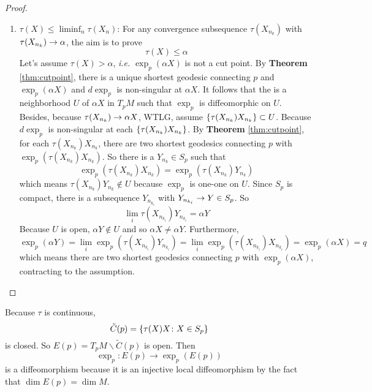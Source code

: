 \begin{enumerate}[label=\arabic{*}.]
\begin{proof}
\begin{enumerate}[label=\Roman*.]
			\item $\tau(X) \leq \liminf_n\tau(X_n)$: For any convergence subsequence $\tau(X_{n_k})$ with $\tau(X_{n_k}) \rightarrow \alpha$, the aim is to prove
			\begin{equation*}
				\tau(X) \leq \alpha
			\end{equation*}
			Let's assume $\tau(X) > \alpha$, \emph{i.e.} $\exp_p(\alpha X)$ is not a cut point. By \textbf{Theorem} \ref{thm:cutpoint}, there is a unique shortest geodesic connecting $p$ and $\exp_p(\alpha X)$ and $d\exp_p$ is non-singular at $\alpha X$. It follows that the is a neighborhood $U$ of $\alpha X$ in $T_pM$ such that $\exp_p$ is diffeomorphic on $U$. Besides, because $\tau(X_{n_k}) \rightarrow \alpha X$, WTLG, assume $\left\{\tau(X_{n_k})X_{n_k}\right\} \subset U$. Because $d\exp_p$ is non-singular at each $\left\{\tau(X_{n_k})X_{n_k}\right\}$. By \textbf{Theorem} \ref{thm:cutpoint}, for each $\tau(X_{n_k})X_{n_k}$, there are two shortest geodesics connecting $p$ with $\exp_p(\tau(X_{n_k})X_{n_k})$. So there is a $Y_{n_k} \in S_p$ such that
			\begin{equation*}
				\exp_p(\tau(X_{n_k})X_{n_k}) = \exp_p(\tau(X_{n_k})Y_{n_k})
			\end{equation*}
			which means $\tau(X_{n_k})Y_{n_k} \notin U$ because $\exp_p$ is one-one on $U$. Since $S_p$ is compact, there is a subsequence $Y_{n_{k_i}}$ with $Y_{n_{k_i}} \rightarrow Y \in S_p$. So
			\begin{equation*}
				\lim_i\tau(X_{n_{k_i}}) Y_{n_{k_i}} = \alpha Y
			\end{equation*}
			Because $U$ is open, $\alpha Y \notin U$ and so $\alpha X \neq \alpha Y$. Furthermore,
			\begin{equation*}
				\exp_p(\alpha Y) = \lim_i\exp_p(\tau(X_{n_{k_i}}) Y_{n_{k_i}}) = \lim_i\exp_p(\tau(X_{n_{k_i}})X_{n_{k_i}}) = \exp_p(\alpha X) = q
			\end{equation*}
			which means there are two shortest geodesics connecting $p$ with $\exp_p(\alpha X)$, contracting to the assumption. \qedhere
		\end{enumerate}
	\end{proof}
	Because $\tau$ is continuous,
	\begin{equation*}
		\tilde{C}(p) = \left\{\tau(X)X \colon X \in S_p\right\}
	\end{equation*}
	is closed. So $E(p) = T_pM \backslash \tilde{C}(p)$ is open. Then
	\begin{equation*}
		\exp_p \colon E(p) \longrightarrow \exp_p(E(p))
	\end{equation*}
	is a diffeomorphism because it is an injective local diffeomorphism by the fact that $\dim E(p) = \dim M$.

\end{enumerate}

